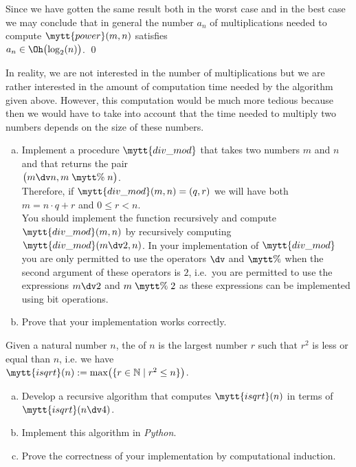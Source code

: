Since we have gotten the same result both in the worst case and in the best case we may conclude
that in general the number $a_n$ of multiplications needed to compute $\mytt{power}(m, n)$ satisfies 
\\[0.2cm]
\hspace*{1.3cm} 
$a_n \in \Oh\bigl(\log_2(n)\bigr)$. \qed

\remark
In reality, we are not interested in the number of multiplications but we are rather interested
in the amount of computation time needed by the algorithm given above.
However, this computation would be much more tedious because then we would have to take into account
that the time needed to multiply two numbers depends on the size of these numbers.

\exercise
\begin{enumerate}[(a)]
\item Implement a procedure $\mytt{div\_mod}$ that takes two numbers $m$ and $n$ and that returns the pair
      \\[0.2cm]
      \hspace*{1.3cm}
      $\bigl(m \dv n, m \;\mytt{\%}\; n\bigr)$.
      \\[0.2cm]
      Therefore, if $\mytt{div\_mod}(m, n) = (q,r)$ we will have both
      \\[0.2cm]
      \hspace*{1.3cm}
      $m = n \cdot q + r$ \quad and \quad $0 \leq r < n$.
      \\[0.2cm]
      You should implement the function recursively and compute 
      $\mytt{div\_mod}(m, n)$ by recursively computing $\mytt{div\_mod}(m \dv 2, n)$.
      In your implementation of $\mytt{div\_mod}$ you are only permitted to use the operators $\dv$ and
      $\mytt{\%}$ when the second argument of these operators is $2$, i.e.~you are permitted to
      use the expressions $m \dv 2$ and $m \;\mytt{\%}\; 2$ as these expressions can be implemented
      using bit operations.
\item Prove that your implementation works correctly.
      \eoxs
\end{enumerate} 

\exercise
Given a natural number $n$, the   of $n$ is the largest
number $r$ such that $r^2$ is less or equal than $n$, i.e. we have
\\[0.2cm]
\hspace*{1.3cm}
$\mytt{isqrt}(n) := \max\bigl(\{ r \in \mathbb{N} \mid r^2 \leq n \}\bigr)$.
\begin{enumerate}[(a)]
\item Develop a recursive algorithm that computes $\mytt{isqrt}(n)$ in terms of $\mytt{isqrt}(n\dv4)$.
\item Implement this algorithm in \textsl{Python}.
\item Prove the correctness of your implementation by computational induction. \eoxs
\end{enumerate}

